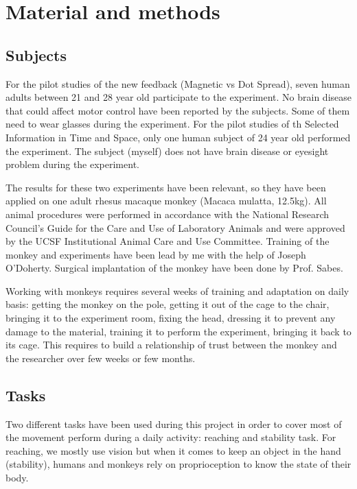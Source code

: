 \documentclass[preprint,12pt]{elsarticle}
\begin{document}
\section{Material and methods}
\subsection{Subjects}
For the pilot studies of the new feedback (Magnetic vs Dot Spread), seven human adults between 21 and 28 year old participate to the experiment. No brain disease that could affect motor control have been reported by the subjects. Some of them need to wear glasses during the experiment. For the pilot studies of th Selected Information in Time and Space, only one human subject of 24 year old performed the experiment. The subject (myself) does not have brain disease or eyesight problem during the experiment.

The results for these two experiments have been relevant, so they have been applied on one adult rhesus macaque monkey (Macaca mulatta, 12.5kg). All animal procedures were performed in accordance with the National Research Council’s Guide for the Care and Use of Laboratory Animals and were approved by the UCSF Institutional Animal Care and Use Committee. Training of the monkey and experiments have been lead by me with the help of Joseph O'Doherty. Surgical implantation of the monkey have been done by Prof. Sabes.

Working with monkeys requires several weeks of training and adaptation on daily basis: getting the monkey on the pole, getting it out of the cage to the chair, bringing it to the experiment room, fixing the head, dressing it to prevent any damage to the material, training it to perform the experiment, bringing it back to its cage. This requires to build a relationship of trust between the monkey and the researcher over few weeks or few months.

\subsection{Tasks}
Two different tasks have been used during this project in order to cover most of the movement perform during a daily activity: reaching and stability task. For reaching, we mostly use vision but when it comes to keep an object in the hand (stability), humans and monkeys rely on proprioception to know the state of their body.
\end{document}
